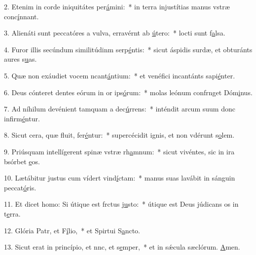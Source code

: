 2. Etenim in corde iniquitátes per\uline{á}mini:~* in terra injustítias manus vstræ conc\uline{í}nnant.\par 
3. Alienáti sunt peccatóres a vulva, erravérnt ab \uline{ú}tero:~* locti sunt f\uline{a}lsa.\par 
4. Furor illis secúndum similitúdinm serp\uline{é}ntis:~* sicut áspidis surdæ, et obturánts aures s\uline{u}as.\par 
5. Quæ non exáudiet vocem ncant\uline{á}ntium:~* et venéfici incantánts sapi\uline{é}nter.\par 
6. Deus cónteret dentes eórum in or ips\uline{ó}rum:~* molas leónum confrnget Dóm\uline{i}nus.\par 
7. Ad níhilum devénient tamquam a dec\uline{ú}rrens:~* inténdit arcum suum donc infirm\uline{é}ntur.\par 
8. Sicut cera, quæ fluit, fer\uline{é}ntur:~* supercécidit ignis, et non vdérunt s\uline{o}lem.\par 
9. Priúsquam intellígerent spinæ vstræ rh\uline{a}mnum:~* sicut vivéntes, sic in ira bsórbet \uline{e}os.\par 
10. Lætábitur justus cum vídert vind\uline{í}ctam:~* manus suas lavábit in sánguin peccat\uline{ó}ris.\par 
11. Et dicet homo: Si útique est frctus j\uline{u}sto:~* útique est Deus júdicans os in t\uline{e}rra.\par 
12. Glória Patr, et F\uline{í}lio,~* et Spirtui S\uline{a}ncto.\par 
13. Sicut erat in princípio, et nnc, et s\uline{e}mper,~* et in sǽcula sæclórum. \uline{A}men.\par 
